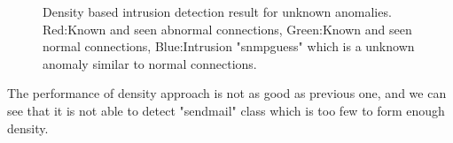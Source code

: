 \begin{figure}[htb2]
\begin{center}
\end{center}
\caption{Density based intrusion detection result for unknown anomalies.  Red:Known and seen abnormal connections, Green:Known and seen normal connections, Blue:Intrusion "snmpguess" which is a unknown anomaly similar to normal connections.} %
\label{fig:refSingleRobot1}
\end{figure}

The performance of density approach is not as good as previous one, and we can see that it is not able to detect "sendmail" class which is too few to form enough density. 
\begin{table}[h]
\begin{center}
\end{center}
\caption{Unknown anomalies that is similar to known normals detection rate}
\label{fig:refSingleRobot1}
\end{table}

